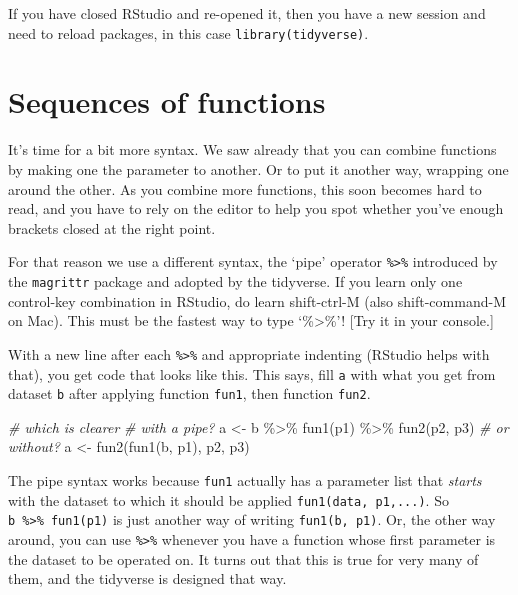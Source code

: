 \documentclass[
]{book}
\newenvironment{Shaded}{\begin{snugshade}}{\end{snugshade}}
\newcommand{\CommentTok}[1]{\textcolor[rgb]{0.56,0.35,0.01}{\textit{#1}}}
\newcommand{\FunctionTok}[1]{\textcolor[rgb]{0.00,0.00,0.00}{#1}}
\newcommand{\NormalTok}[1]{#1}
\newcommand{\OtherTok}[1]{\textcolor[rgb]{0.56,0.35,0.01}{#1}}
\newcommand{\SpecialCharTok}[1]{\textcolor[rgb]{0.00,0.00,0.00}{#1}}
\begin{document}
If you have closed RStudio and re-opened it, then you have a new session and need to reload packages, in this case \texttt{library(tidyverse)}.

\hypertarget{sequences-of-functions}{%
\section{Sequences of functions}\label{sequences-of-functions}}

It's time for a bit more syntax. We saw already that you can combine functions by making one the parameter to another. Or to put it another way, wrapping one around the other. As you combine more functions, this soon becomes hard to read, and you have to rely on the editor to help you spot whether you've enough brackets closed at the right point.

For that reason we use a different syntax, the `pipe' operator \texttt{\%\textgreater{}\%} introduced by the \texttt{magrittr} package and adopted by the tidyverse. If you learn only one control-key combination in RStudio, do learn shift-ctrl-M (also shift-command-M on Mac). This must be the fastest way to type `\%\textgreater\%'! {[}Try it in your console.{]}

With a new line after each \texttt{\%\textgreater{}\%} and appropriate indenting (RStudio helps with that), you get code that looks like this. This says, fill \texttt{a} with what you get from dataset \texttt{b} after applying function \texttt{fun1}, then function \texttt{fun2}.

\begin{Shaded}
\begin{Highlighting}[]
\CommentTok{\# which is clearer}
\CommentTok{\# with a pipe?}
\NormalTok{a }\OtherTok{\textless{}{-}}\NormalTok{ b }\SpecialCharTok{\%\textgreater{}\%} 
  \FunctionTok{fun1}\NormalTok{(p1) }\SpecialCharTok{\%\textgreater{}\%} 
  \FunctionTok{fun2}\NormalTok{(p2, p3)}
\CommentTok{\# or without?}
\NormalTok{a }\OtherTok{\textless{}{-}} \FunctionTok{fun2}\NormalTok{(}\FunctionTok{fun1}\NormalTok{(b, p1), p2, p3)}
\end{Highlighting}
\end{Shaded}

The pipe syntax works because \texttt{fun1} actually has a parameter list that \emph{starts} with the dataset to which it should be applied \texttt{fun1(data,\ p1,...)}. So \texttt{b\ \%\textgreater{}\%\ fun1(p1)} is just another way of writing \texttt{fun1(b,\ p1)}. Or, the other way around, you can use \texttt{\%\textgreater{}\%} whenever you have a function whose first parameter is the dataset to be operated on. It turns out that this is true for very many of them, and the tidyverse is designed that way.
\end{document}
